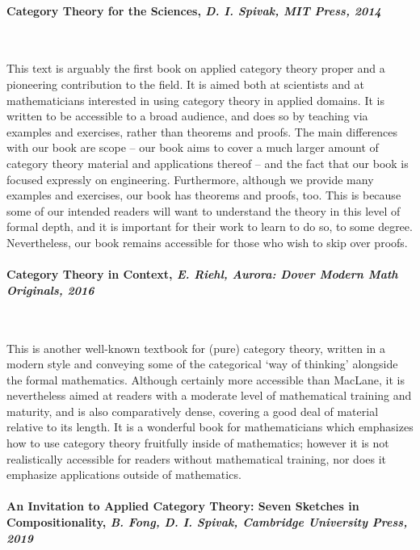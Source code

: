 \documentclass[10pt, article, one side]{memoir}
\begin{document}
    \paragraph{Category Theory for the Sciences, \emph{D.
            I.
            Spivak, MIT Press, 2014}~\cite{spivak2014category}}
    \

    This text is arguably the first book on applied category theory proper and a pioneering contribution to the field.
    It is aimed both at scientists and at mathematicians interested in using category theory in applied domains.
    It is written to be accessible to a broad audience, and does so by teaching via examples and exercises, rather than theorems and proofs.
    The main differences with our book are scope -- our book aims to cover a much larger amount of category theory material and applications thereof -- and the fact that our book is focused expressly on engineering.
    Furthermore, although we provide many examples and exercises, our book has theorems and proofs, too.
    This is because some of our intended readers will want to understand the theory in this level of formal depth, and it is important for their work to learn to do so, to some degree.
    Nevertheless, our book remains accessible for those who wish to skip over proofs.

    \paragraph{Category Theory in Context, \emph{E.
            Riehl, Aurora: Dover Modern Math Originals, 2016}~\cite{riehl2017category}}
    \

    This is another well-known textbook for (pure) category theory, written in a modern style and conveying some of the categorical `way of thinking' alongside the formal mathematics.
    Although certainly more accessible than MacLane, it is nevertheless aimed at readers with a moderate level of mathematical training and maturity, and is also comparatively dense, covering a good deal of material relative to its length.
    It is a wonderful book for mathematicians which emphasizes how to use category theory fruitfully inside of mathematics; however it is not realistically accessible for readers without mathematical training, nor does it emphasize applications outside of mathematics.

    \paragraph{An Invitation to Applied Category Theory: Seven Sketches in Compositionality, \emph{B.
            Fong, D.
            I.
            Spivak, Cambridge University Press, 2019}~\cite{fong2019invitation}}
    \
\end{document}
